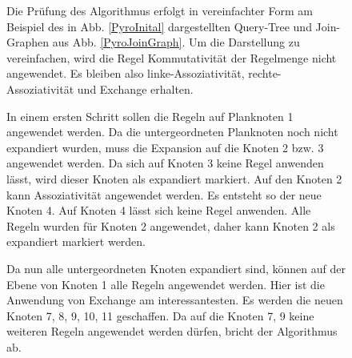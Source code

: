\begin{figure}[h]
Die Prüfung des Algorithmus erfolgt in vereinfachter Form am Beispiel des in Abb. \ref{PyroInital} dargestellten Query-Tree und Join-Graphen aus Abb. \ref{PyroJoinGraph}. Um die Darstellung zu vereinfachen, wird die Regel Kommutativität der Regelmenge nicht angewendet. Es bleiben also linke-Assoziativität, rechte-Assoziativität und Exchange erhalten.

In einem ersten Schritt sollen die Regeln auf Planknoten 1 angewendet werden. Da die untergeordneten Planknoten noch nicht expandiert wurden, muss die Expansion auf die Knoten 2 bzw. 3 angewendet werden. Da sich auf Knoten 3 keine Regel anwenden lässt, wird dieser Knoten als expandiert markiert. Auf den Knoten 2 kann Assoziativität angewendet werden. Es entsteht so der neue Knoten 4. Auf Knoten 4 lässt sich keine Regel anwenden. Alle Regeln wurden für Knoten 2 angewendet, daher kann Knoten 2 als expandiert markiert werden.

Da nun alle untergeordneten Knoten expandiert sind, können auf der Ebene von Knoten 1 alle Regeln angewendet werden. Hier ist die Anwendung von Exchange am interessantesten. Es werden die neuen Knoten 7, 8, 9, 10, 11 geschaffen. Da auf die Knoten 7, 9 keine weiteren Regeln angewendet werden dürfen, bricht der Algorithmus ab. 


\end{figure}
